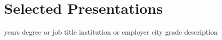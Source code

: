 \section{Selected Presentations}

\cventry
{years}
{degree or job title}
{institution or employer}
{city}
{grade}
{description}